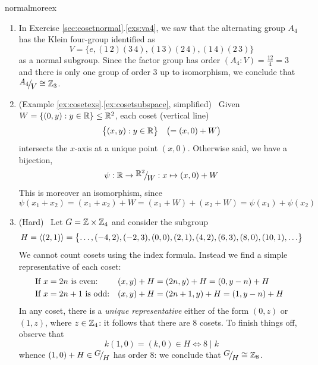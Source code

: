 \begin{examples}{}{normalmoreex}
\begin{enumerate}
	  \item\label{ex:a4normal} In Exercise \ref*{sec:cosetnormal}.\ref{exs:va4}, we saw that the alternating group $A_4$ has the Klein four-group identified as
	  \[
			V=\bigl\{
				e,(1\,2)(3\,4),(1\,3)(2\,4),(1\,4)(2\,3)
			\bigr\}
		\]
	  as a normal subgroup. Since the factor group has order $(A_4:V)=\frac{12}4=3$ and there is only one group of order 3 up to isomorphism, we conclude that $\quotient{A_4}{V}\cong\Z_3$.%
	  
	  
	  \item (Example \ref*{ex:cosetexs}.\ref{ex:cosetsubspace}, simplified) \ Given $W=\{(0,y):y\in\mathbb{R}\}\le \mathbb{R}^2$, each coset (vertical line)
	  \[
	  	\bigl\{(x,y):y\in\mathbb{R}\bigr\}\quad \bigl(=(x,0)+W\bigr)
	  \]
	  intersects the $x$-axis at a unique point $(x,0)$. Otherwise said, we have a bijection,
	  \[
	  	\psi:\R\to\smash{\quotient{\R^2}W}:x\mapsto (x,0)+W
	  \]
	  This is moreover an isomorphism, since
	  \[
	  	\psi(x_1+x_2)=(x_1+x_2)+W= (x_1+W)+(x_2+W)=\psi(x_1)+\psi(x_2)
	  \]
	  
	  
	  \item (Hard) \ Let $G=\mathbb{Z}\times\mathbb{Z}_4$ and consider the subgroup
	  \[
	  	H=\left\langle (2,1)\right\rangle =\bigl\{\ldots,(-4,2),(-2,3),(0,0),(2,1),(4,2),(6,3),(8,0),(10,1),\ldots\bigr\}
	  \]
	  We cannot count cosets using the index formula. Instead we find a simple representative of each coset:
	  \[
			\begin{array}{@{}ll}
				\text{If $x=2n$ is even:}&(x,y)+H=(2n,y)+H=(0,y-n)+H\\[3pt]
	  		\text{If $x=2n+1$ is odd:}&(x,y)+H=(2n+1,y)+H=(1,y-n)+H
			\end{array}
	  \]
	  In any coset, there is a \emph{unique representative} either of the form $(0,z)$ or $(1,z)$, where $z\in\mathbb{Z}_4$: it follows that there are 8 cosets. To finish things off, observe that
	  \[
	  	k(1,0)=(k,0)\in H\iff 8\mid k
	  \]
		whence $(1,0)+H\in\quotient GH$ has order 8: we conclude that $\quotient GH\cong\Z_8$.
	

\end{enumerate}
\end{examples}
